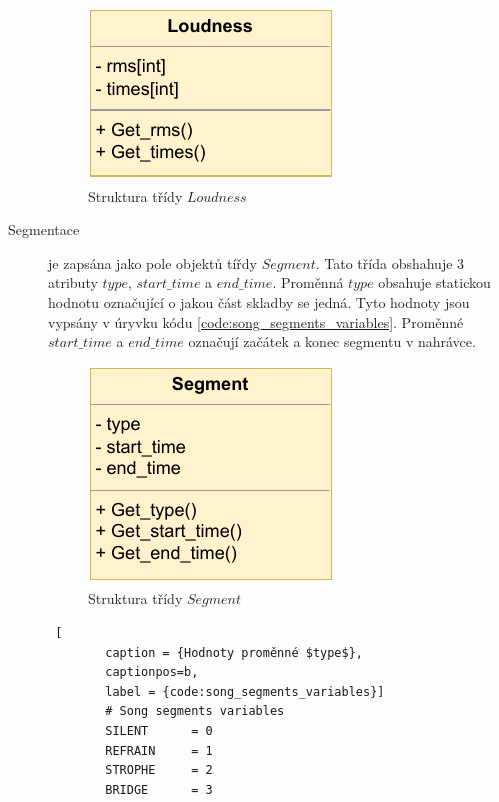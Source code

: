 \begin{description}
    \begin{figure}[H]
        \centering
        \includegraphics[width = 0.3\linewidth]{obrazky/UML_diagram_Loudness.pdf}
        \caption{Struktura třídy $Loudness$}
        \label{fig:Loudness_class_diagram}
    \end{figure}

    \item[Segmentace] je zapsána jako pole objektů tířdy $Segment$. Tato třída obshahuje 3 atributy $type$, $start\_time$ a $end\_time$. Proměnná $type$ obsahuje statickou hodnotu označující o jakou část skladby se jedná. Tyto hodnoty jsou vypsány v úryvku kódu \ref{code:song_segments_variables}.
    Proměnné $start\_time$ a $end\_time$ označují začátek a konec segmentu v nahrávce. 

    \begin{figure}[H]
        \centering
        \includegraphics[width = 0.3\linewidth]{obrazky/UML_diagram_Segment.pdf}
        \caption{Struktura třídy $Segment$}
        \label{fig:Loudness_Segment_diagram}
    \end{figure}
    \begin{lstlisting} [
        caption = {Hodnoty proměnné $type$},
        captionpos=b,
        label = {code:song_segments_variables}]
        # Song segments variables
        SILENT      = 0
        REFRAIN     = 1
        STROPHE     = 2
        BRIDGE      = 3
    \end{lstlisting}


\end{description}
